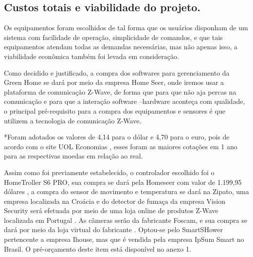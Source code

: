 \subsection{Custos totais e viabilidade do projeto.}

	Os equipamentos foram escolhidos de tal forma que os usuários disponham de um sistema com facilidade de operação, simplicidade de comandos, e que tais equipamentos atendam todas as demandas necessárias, mas não apenas isso, a viabilidade econômica também foi levada em consideração.
	
	Como decidido e justificado, a compra dos softwares para gerenciamento da Green Home se dará por meio da empresa Home Seer, onde iremos usar a plataforma de comunicação Z-Wave, de forma que para que não aja percas na comunicação e para que a interação software –hardware aconteça com qualidade, o principal pré-requisito para a compra dos equipamentos e sensores é que utilizem a tecnologia de comunicação Z-Wave.


*Foram adotados os valores de 4,14 para o dólar e 4,70 para o euro, pois de acordo com o site UOL Economias \cite{UolDolar}\cite{UolEuro}, esses foram as maiores cotações em 1 ano para as respectivas moedas em relação ao real. 



	Assim como foi previamente estabelecido, o controlador escolhido foi o HomeTroller S6 PRO, sua compra se dará pela Homeseer com valor de 1.199,95 dólares \cite{HomeSeerHomeTroller}, a compra do sensor de movimento e temperatura se dará na Zipato, uma empresa localizada na Croácia e do detector de fumaça da empresa Vision Security será efetuada por meio de uma loja online de produtos Z-Wave localizada em Portugal \cite{ProdutosZwave}. As câmeras serão da fabricante Foscam, e sua compra se dará por meio da loja virtual do fabricante \cite{LojaFoscam}.
	Optou-se pelo SmartSHower pertencente a empresa Ihouse, mas que é vendida pela empresa IpSum Smart no Brasil. O pré-orçamento deste item está disponível no anexo 1. 

